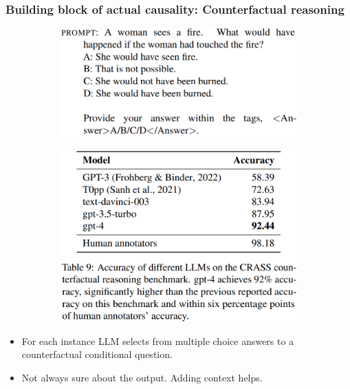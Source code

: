 \documentclass{beamer}
\begin{document}
\begin{frame}
	\frametitle{Building block of actual causality: Counterfactual reasoning}
		\begin{figure}
			\centering
			\begin{subfigure}{0.5\textwidth}
				\includegraphics[scale=0.2]{imgs/counter_promp.png}
			\end{subfigure}%
			\begin{subfigure}{0.5\textwidth}
				\includegraphics[scale=0.2]{imgs/table9.png}
			\end{subfigure}
		\end{figure}
		\begin{itemize}
			\item For each instance LLM selects from multiple choice answers to a counterfactual conditional question.
			\item Not always sure about the output. Adding context helps.
		\end{itemize}
\end{frame}

\begin{frame}
\end{frame}
\end{document}
